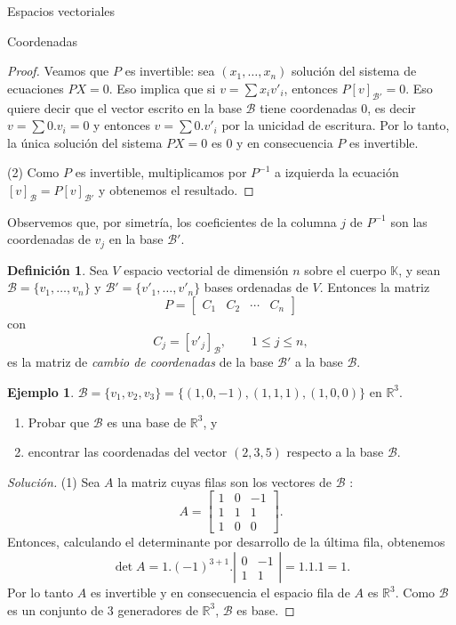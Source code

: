 \documentclass[a4paper,12pt,twoside,spanish,reqno]{amsbook}
\theoremstyle{definition}
\newtheorem{definicion}{Definici\'on}[section]
\newtheorem{ejemplo}{Ejemplo}[section]
\theoremstyle{remark}
\newcommand{\R}{\mathbb R}
\newcommand{\K}{\mathbb K}
\begin{document}
\begin{chapter}{Espacios vectoriales}
\begin{section}{Coordenadas}
\begin{proof}
        Veamos que $P$  es invertible: sea $(x_1,\ldots,x_n)$ solución del sistema de ecuaciones $PX =0$. Eso implica que si $v =\sum x_i v'_i$,  entonces $P[v]_{\mathcal B'}=0$.     Eso quiere decir que el vector  escrito en la base $\mathcal B$ tiene coordenadas $0$,  es decir $v = \sum 0. v_i =0$ y entonces $v = \sum 0. v'_i$ por la unicidad de escritura. Por lo tanto, la única solución del sistema $PX=0$ es 0 y en consecuencia $P$  es invertible.
        
        (2)  Como $P$ es invertible, multiplicamos por $P^{-1}$  a izquierda la ecuación $[v]_\mathcal{B} = P[v]_\mathcal{B'}$ y obtenemos el resultado.
    \end{proof}

    Observemos que, por simetría,  los coeficientes de la columna $j$ de $P^{-1}$ son las coordenadas de $v_j$ en la base $\mathcal{B'}$. 
    
    \begin{definicion} 
        Sea $V$  espacio vectorial de dimensión $n$  sobre el cuerpo $\K$, 	y sean $\mathcal{B} = \{v_1,\ldots,v_n\}$ y $\mathcal{B'} = \{v'_1,\ldots,v'_n\}$ bases ordenadas de $V$. Entonces la matriz
        $$
        P = \begin{bmatrix}
         C_1 &C_2 &\cdots &C_n
        \end{bmatrix}
        $$
        con 
        $$
            C_j = [v'_j]_\mathcal{B},\qquad 1 \le j \le n,
        $$
        es la matriz de \textit{cambio de coordenadas} de la base $\mathcal{B'}$  a la base $\mathcal{B}$.
    \end{definicion}
    
    
    \begin{ejemplo}
         $\mathcal{B} = \{v_1,v_2,v_3 \}=\{(1,0,-1),(1,1,1),(1,0,0) \}$ en $\R^3$.
        \begin{enumerate}
            \item Probar que $\mathcal{B}$ es una base de $\R^3$, y 
            \item encontrar las coordenadas del vector  $(2,3,5)$ respecto a la base  $\mathcal{B}$. 
        \end{enumerate}
    \end{ejemplo}
\begin{proof}[Solución]
    (1) Sea $A$ la matriz cuyas filas son los vectores de $\mathcal{B}$ :
    $$
    A = \begin{bmatrix} 1&0&-1\\1&1&1\\1&0&0	\end{bmatrix}.
    $$
    Entonces,  calculando el determinante  por desarrollo de la última fila, obtenemos
    $$
    \det A = 1.(-1)^{3+1}. 
    \left| \begin{matrix} 0&-1\\1&1	\end{matrix} \right| = 1.1.1 =1.
    $$ 
    Por  lo tanto $A$ es invertible y en consecuencia el espacio fila de $A$ es $\R^3$. Como $\mathcal{B}$ es un conjunto de 3  generadores de  $\R^3$, $\mathcal{B}$ es base.
    

\end{proof}
\end{section}
\end{chapter}
\end{document}
